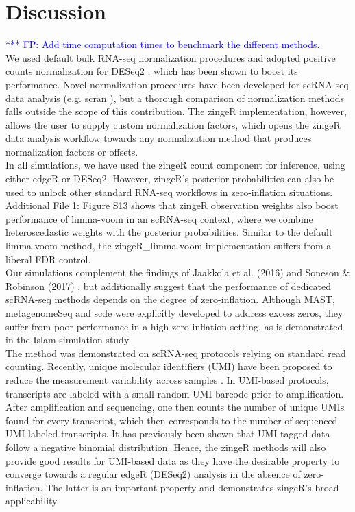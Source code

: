 \documentclass{bmcart}
\newcommand{\fanny}[1]{\textcolor{blue}{*** FP: #1}}
\begin{document}

\section*{Discussion}

\fanny{Add time computation times to benchmark the different methods.\\}
We used default bulk RNA-seq normalization procedures and adopted positive counts normalization for DESeq2 \cite{McMurdie2013}, which has been shown to boost its performance.
Novel normalization procedures have been developed for scRNA-seq data analysis (e.g. scran \cite{Lun2016a}), but a thorough comparison of normalization methods falls outside the scope of this contribution.
The zingeR implementation, however, allows the user to supply custom normalization factors, which opens the zingeR data analysis workflow towards any normalization method that produces normalization factors or offsets.\\
In all simulations, we have used the zingeR count component for inference, using either edgeR or DESeq2.
However, zingeR's posterior probabilities can also be used to unlock  other standard RNA-seq workflows in zero-inflation situations. 
Additional File 1: Figure S13 shows that zingeR observation weights also boost performance of limma-voom in an scRNA-seq context, where we combine heteroscedastic weights with the posterior probabilities.
Similar to the default limma-voom method, the zingeR\_limma-voom implementation suffers from a liberal FDR control.\\
Our simulations complement the findings of Jaakkola et al. (2016) \cite{Jaakkola2016} and Soneson \& Robinson (2017) \cite{Soneson2017}, but additionally suggest that the performance of dedicated scRNA-seq methods depends on the degree of zero-inflation.
Although MAST, metagenomeSeq and scde were explicitly developed to address excess zeros, they suffer from poor performance in a high zero-inflation setting, as is demonstrated in the Islam simulation study.\\
The method was demonstrated on scRNA-seq protocols relying on standard read counting. Recently, unique molecular identifiers (UMI) have been proposed to reduce the measurement variability across samples \cite{Islam2013}. In UMI-based protocols, transcripts are labeled with a small random UMI barcode prior to amplification. After amplification and sequencing, one then counts the number of unique UMIs found for every transcript, which then corresponds to the number of sequenced UMI-labeled transcripts.
It has previously been shown \cite{Grun2014} that UMI-tagged data follow a negative binomial distribution.
Hence, the zingeR methods will also provide good results for UMI-based data as they have the desirable property to converge towards a regular edgeR (DESeq2) analysis in the absence of zero-inflation. The latter is an important property and demonstrates zingeR's broad applicability.
\end{document}
